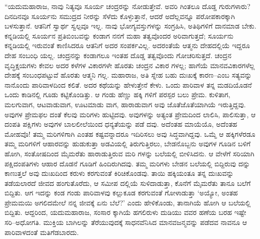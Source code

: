 “ಯದುಮಹಾರಾಜ, ನಾವು ನಿತ್ಯವೂ ಸೂರ್ಯ ಚಂದ್ರರನ್ನು ನೋಡುತ್ತೇವೆ. ಅವರಿ ಗಿಂತಲೂ ದೊಡ್ಡ ಗುರುಗಳಾರು? ದಿನದಿನವೂ ಸೂರ್ಯನು ಸಮುದ್ರದ ನೀರನ್ನು ಸೆಳೆದು ಕೊಳ್ಳುತ್ತಾನೆ, ಆದರೆ ಅದೆಲ್ಲವನ್ನೂ ಪರೋಪಕಾರಕ್ಕಾಗಿ ಬಳಸುತ್ತಾನೆ. ಆತನಿಗೆ ಸ್ವಾರ್ಥ ಸ್ವಲ್ಪವೂ ಇಲ್ಲ. ನಾವು ಭೋಗ್ಯವಸ್ತುಗಳನ್ನು ಸಂಗ್ರಹಿಸಿ, ಅತಿಥಿಗಳಿಗೆ ದಾನಮಾಡ ಬೇಕು. ಕನ್ನಡಿಯಲ್ಲಿ ಸೂರ್ಯನ ಪ್ರತಿಬಿಂಬವನ್ನು ಕಂಡಾಗ ನನಗೆ ಮಹಾ ತತ್ವವೊಂದರ ಅರಿವಾಗುತ್ತದೆ; ಸೂರ್ಯನು ಕನ್ನಡಿಯಲ್ಲಿ ಇರುವಂತೆ ಕಾಣಿಸಿದರೂ ಆತನಿಗೆ ಅದರ ಸಂಪರ್ಕವಿಲ್ಲ. ಅದರಂತೆಯೆ ಆತ್ಮನು ದೇಹದಲ್ಲಿಯೆ ಇದ್ದರೂ ದೇಹ ಸಂಬಂಧಿ ಯಲ್ಲ. ಚಂದ್ರನನ್ನು ಕಂಡಾಗಲೂ ಇಂತಹ ದೊಡ್ಡ ತತ್ವವೊಂದು ಗೋಚರಿಸುತ್ತದೆ. ಚಂದ್ರನ ವೃದ್ಧಿಕ್ಷಯಗಳು ಕೇವಲ ಅದರ ಕಳೆಗಳ ವಿಕಾರಗಳೇ ಹೊರತು ಚಂದ್ರನ ವಿಕಾರ ಗಳಲ್ಲ; ಹಾಗೆಯೆ ಮಾನವವಿಕಾರಗಳೆಲ್ಲ ದೇಹಕ್ಕೆ ಸಂಬಂಧಪಟ್ಟುವೆ ಹೊರತು ಆತ್ಮನಿ ಗಲ್ಲ. ಮಹಾರಾಜ, ಅತಿ ಸ್ನೇಹ ಬಹು ದುಃಖಕ್ಕೆ ಕಾರಣ–ಎಂಬ ಸತ್ಯವನ್ನು ನಾನೊಂದು ಪಾರಿವಾಳದಿಂದ ಕಲಿತೆ. ಅದರ ಕಥೆಯನ್ನು ಹೇಳುತ್ತೇನೆ ಕೇಳು. ಒಂದು ಪಾರಿವಾಳ ತನ್ನ ಮಡದಿಯೊಡನೆ ಒಂದು ಕಾಡಿನಲ್ಲಿ ಗೂಡು ಕಟ್ಟಿಕೊಂಡಿತ್ತು. ಆ ಗಂಡು ಹೆಣ್ಣು ಹಕ್ಕಿ ಗಳಿಗೆ ಪರಸ್ಪರ ಬಲು ಪ್ರೇಮ. ಕುಳಿತಾಗ, ಮಲಗುವಾಗ, ಆಟವಾಡುವಾಗ, ಊಟಮಾಡು ವಾಗ, ಹಾರಾಡುವಾಗ ಅವು ಜೊತೆಜೊತೆಯಾಗಿಯೆ ಇರುತ್ತಿದ್ದವು. ಅವುಗಳ ಪ್ರೇಮಫಲ ದಂತೆ ಕೆಲವು ಮರಿಗಳು ಹುಟ್ಟಿದವು. ಅವುಗಳನ್ನು ಅತ್ಯಂತ ಪ್ರೇಮದಿಂದ ಲಾಲಿಸಿ, ಪಾಲಿಸುತ್ತಾ, ಆ ದಂಪತಿ ಪಕ್ಷಿಗಳು ಅವುಗಳ ಬಾಲಲೀಲೆಯಿಂದ ಧನ್ಯತೆಯನ್ನು ಪಡೆ ದವು. ಅದೆಂತಹ ಮಾಯೆಯೊ, ಅದೆಂತಹ ಮೋಹವೊ! ತಮ್ಮ ಮರಿಗಳಿಗಾಗಿ ಎಂತಹ ಕಷ್ಟವನ್ನಾದರೂ ಇದಿರಿಸಲು ಅವು ಸಿದ್ಧವಾಗಿದ್ದವು. ಒಮ್ಮೆ ಆ ಹಕ್ಕಿಗಳೆರಡೂ ತಮ್ಮ ಮರಿಗಳಿಗೆ ಆಹಾರವನ್ನು ಹುಡುಕುತ್ತಾ ಅಡವಿಯಲ್ಲಿ ತಿರುಗುತ್ತಿರಲು, ಬೇಡನೊಬ್ಬನು ಅವುಗಳ ಗೂಡಿನ ಬಳಿಗೆ ಹೋಗಿ, ಸಂತೋಷದಿಂದ ಮೈಮರೆತು ಹಾರಾಡುತ್ತಿರುವ ಮರಿ ಗಳನ್ನು ಬಲೆಯಲ್ಲಿ ಬೀಳಿಸಿದನು. ಆ ವೇಳೆಗೆ ಸರಿಯಾಗಿ ಪಕ್ಷಿದಂಪತಿಗಳು ಆಹಾರ ದೊಡನೆ ಗೂಡಿಗೆ ಹಿಂದಿರುಗಿದವು. ತಮ್ಮ ಮರಿಗಳು ಬೇಡನ ಬಲೆಯಲ್ಲಿ ಬಿದ್ದಿರುವು ದನ್ನು ಕಾಣುತ್ತಲೆ ಅವು ದುಃಖದಿಂದ ಕರುಳು ಕರಗುವಂತೆ ಕಿರಿಚಿಕೊಂಡವು. ತಾಯಿ ಹಕ್ಕಿಯಂತೂ ತನ್ನ ದುಃಖವನ್ನು ತಡೆಯಲಾರದೆ ಜೀವದ ಹಂಗುತೊರೆದು, ಆ ಸಮೀಪ ದಲ್ಲಿಯೆ ಸುಳಿದಾಡುತ್ತಾ, ಕೊನೆಗೆ ಮೈಮರೆತು ತಾನೂ ಬಲೆಗೆ ಬಿದ್ದಿತು. ಆಗ ಇದನ್ನು ಕಂಡ ಗಂಡು ಪಾರಿವಾಳವು ಕಲ್ಲುಕೂಡ ಕರಗುವಂತೆ ಗೋಳಾಡುತ್ತಾ ‘ಅಯ್ಯೋ, ಅಂತಹ ಪ್ರೇಮಮಯಿ ಅಗಲಿದಮೇಲೆ ನನ್ನ ಜೀವಕ್ಕೆ ಏನು ಬೆಲೆ?’ ಎಂದು ಹೇಳಿಕೊಂಡು, ತಾನಾಗಿಯೆ ಹೋಗಿ ಆ ಬಲೆಯಲ್ಲಿ ಬಿದ್ದಿತು. ಆದ್ದರಿಂದ, ಯದುಮಹಾರಾಜ, ಸಂಸಾರ ಕ್ಕಾಗಿಯೆ ಹಗಲಿರುಳು ದುಡಿಯು ವವರ ಹಣೆಯ ಬರಹ ಇಷ್ಟೇ ಸರಿ–ಅಧೋಗತಿ. ಮುಕ್ತಿಯ ಬಾಗಿಲನ್ನು ತೆರೆಯುವುದಕ್ಕೆ ಸಾಧನವೆನಿಸಿದ ಮಾನವಜನ್ಮವನ್ನು ಪಡೆದವ ನಾವನೂ ಆ ಪಾರಿವಾಳದಂತೆ ಮತಿಗೆಡಬಾರದು.

